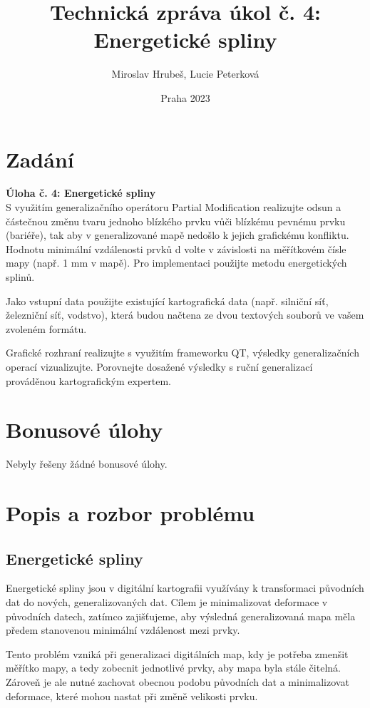 \documentclass[a4paper,12pt]{article}
\title{Technická zpráva úkol č. 4: Energetické spliny}
\author{Miroslav Hrubeš, Lucie Peterková}
\date{Praha 2023}
\begin{document}
    \maketitle
    \newpage
    \section{Zadání}
    \textbf{Úloha č. 4: Energetické spliny}\\
    S využitím generalizačního operátoru Partial Modification realizujte odsun a částečnou změnu tvaru jednoho blízkého prvku vůči blízkému pevnému prvku (bariéře), tak aby v generalizované mapě nedošlo k jejich grafickému konfliktu. Hodnotu minimální vzdálenosti prvků d volte v závislosti na měřítkovém čísle mapy (např. 1 mm v mapě). Pro implementaci použijte metodu energetických splinů.
    
    Jako vstupní data použijte existující kartografická data (např. silniční síť, železniční síť, vodstvo), která budou načtena ze dvou textových souborů ve vašem zvoleném formátu.
    
    Grafické rozhraní realizujte s využitím frameworku QT, výsledky generalizačních operací vizualizujte. Porovnejte dosažené výsledky s ruční generalizací prováděnou kartografickým expertem.

    \section{Bonusové úlohy}
    Nebyly řešeny žádné bonusové úlohy.

    \newpage
    \section{Popis a rozbor problému}
    \subsection{Energetické spliny}
    Energetické spliny jsou v digitální kartografii využívány k transformaci původních dat do nových, generalizovaných dat. Cílem je minimalizovat deformace v původních datech, zatímco zajišťujeme, aby výsledná generalizovaná mapa měla předem stanovenou minimální vzdálenost mezi prvky.

    Tento problém vzniká při generalizaci digitálních map, kdy je potřeba zmenšit měřítko mapy, a tedy zobecnit jednotlivé prvky, aby mapa byla stále čitelná. Zároveň je ale nutné zachovat obecnou podobu původních dat a minimalizovat deformace, které mohou nastat při změně velikosti prvku.
\end{document}
